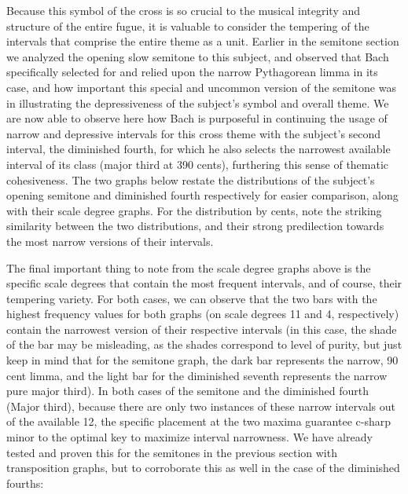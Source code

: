 Because this symbol of the cross is so crucial to the musical integrity
and structure of the entire fugue, it is valuable to consider the
tempering of the intervals that comprise the entire theme as a unit.
Earlier in the semitone section we analyzed the opening slow semitone to
this subject, and observed that Bach specifically selected for and
relied upon the narrow Pythagorean limma in its case, and how important
this special and uncommon version of the semitone was in illustrating
the depressiveness of the subject's symbol and overall theme. We are now
able to observe here how Bach is purposeful in continuing the usage of
narrow and depressive intervals for this cross theme with the subject's
second interval, the diminished fourth, for which he also selects the
narrowest available interval of its class (major third at 390 cents),
furthering this sense of thematic cohesiveness. The two graphs below
restate the distributions of the subject's opening semitone and
diminished fourth respectively for easier comparison, along with their
scale degree graphs. For the distribution by cents, note the striking
similarity between the two distributions, and their strong predilection
towards the most narrow versions of their intervals.


    \begin{center}
    \end{center}
    

    \begin{center}
    \end{center}
    
    The final important thing to note from the scale degree graphs above is
the specific scale degrees that contain the most frequent intervals, and
of course, their tempering variety. For both cases, we can observe that
the two bars with the highest frequency values for both graphs (on scale
degrees 11 and 4, respectively) contain the narrowest version of their
respective intervals (in this case, the shade of the bar may be
misleading, as the shades correspond to level of purity, but just keep
in mind that for the semitone graph, the dark bar represents the narrow,
90 cent limma, and the light bar for the diminished seventh represents
the narrow pure major third). In both cases of the semitone and the
diminished fourth (Major third), because there are only two instances of
these narrow intervals out of the available 12, the specific placement
at the two maxima guarantee c-sharp minor to the optimal key to maximize
interval narrowness. We have already tested and proven this for the
semitones in the previous section with transposition graphs, but to
corroborate this as well in the case of the diminished fourths:


